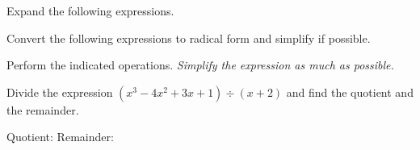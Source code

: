 \documentclass[11pt]{exam}
\begin{document}
\begin{questions}
\question[20] Expand the following expressions.
\noaddpoints
\vspace{2pt}
\addpoints

\question[10] Convert the following expressions to radical form and simplify if possible. 
\noaddpoints
\vspace{2pt}

\begin{parts}
\end{parts}
\vspace{2.5in}
\addpoints

\question[20] Perform the indicated operations. \emph{Simplify the expression as much as possible.}
\noaddpoints
\vspace{2pt}
\addpoints

\question[10] Divide the expression $(x^3-4x^2+3x+1)\div (x+2)$ and find the quotient and the remainder.
\addpoints
\vspace{3.2in}

Quotient: \hfill Remainder: \hspace{2in}

\end{questions}
\end{document}
